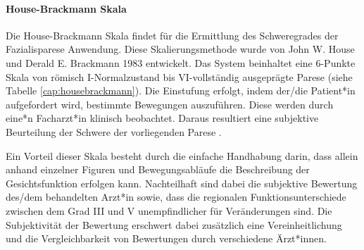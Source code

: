 \paragraph{House-Brackmann Skala} Die House-Brackmann Skala findet für die Ermittlung des Schweregrades der Fazialisparese Anwendung. Diese Skalierungsmethode wurde von John W. House und Derald E. Brackmann 1983 entwickelt. Das System beinhaltet eine 6-Punkte Skala von römisch I-Normalzustand bis VI-vollständig ausgeprägte Parese (siehe Tabelle \ref{cap:housebrackmann}). Die Einstufung erfolgt, indem der/die Patient*in aufgefordert wird, bestimmte Bewegungen auszuführen. Diese werden durch eine*n Facharzt*in klinisch beobachtet. Daraus resultiert eine subjektive Beurteilung der Schwere der vorliegenden Parese \cite{housebrackmann}.

\clearpage

Ein Vorteil dieser Skala besteht durch die einfache Handhabung darin, dass allein anhand einzelner Figuren und Bewegungsabläufe die Beschreibung der Gesichtsfunktion erfolgen kann. Nachteilhaft sind dabei die subjektive Bewertung des/dem behandelten Arzt*in sowie, dass die regionalen Funktionsunterschiede zwischen dem Grad III und V unempfindlicher für Veränderungen sind. Die Subjektivität der Bewertung erschwert dabei zusätzlich eine Vereinheitlichung und die Vergleichbarkeit von Bewertungen durch verschiedene Ärzt*innen.

